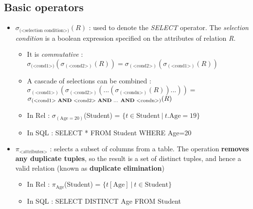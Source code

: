 \subsection{Basic operators}

\begin{itemize}
    \item {} $\sigma_{\text{(<selection condition>)}}(R)$ : used to denote the \textit{SELECT} operator. The \textit{selection condition} is a boolean expression specified on the attributes of relation \textit{R}.
        \begin{itemize}
            \item It is \textit{commutative} : $\sigma_{(\text{<cond1>)}}(\sigma_{(\text{<cond2>})}(R)) = \sigma_{(\text{<cond2>})}(\sigma_{(\text{<cond1>})}(R))$
            \item A cascade of selections can be combined : $\sigma_{(\text{<cond1>})}(\sigma_{(\text{<cond2>})}(...(\sigma_{(\text{<condn>})}(R))...)) =$ \\$\sigma_{\text{(<cond1> \textbf{AND} <cond2> \textbf{AND} ... \textbf{AND} <condn>})}(R)$
            \item In Rel : $\sigma_{(\text{Age}=20)}$(Student) = $\{t \in \text{Student} \ | \ t.\text{Age}=19 \}$
            \item In SQL : SELECT * FROM Student WHERE Age=20
        \end{itemize}
    \item {} $\pi_{\text{<attributes>}}$ : selects a subset of columns from a table. The operation \textbf{removes any duplicate tuples}, so the result is a set of distinct tuples, and hence a valid relation (known as \textbf{duplicate elimination})
        \begin{itemize}
            \item In Rel : $\pi_{\text{Age}}$(Student) = $\{ t[\text{Age}] \ | \ t \in \text{Student} \}$
            \item In SQL : SELECT DISTINCT Age FROM Student
        \end{itemize}
\end{itemize}


